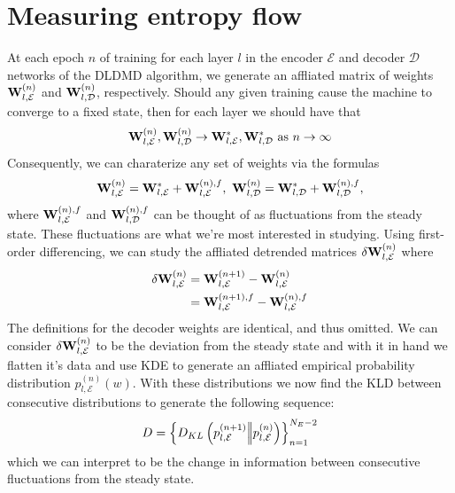 \section{Measuring entropy flow}
At each epoch $n$ of training for each layer $l$ in the encoder $\mathcal{E}$ and 
decoder $\mathcal{D}$ networks of the DLDMD algorithm, we generate an affliated matrix 
of weights ${\bf W}_{l,\mathcal{E}}^{(n)}$ and ${\bf W}_{l,\mathcal{D}}^{(n)}$, respectively.
Should any given training cause the machine to converge to a fixed state, then for each layer
we should have that
\begin{equation}
    {\bf W}_{l,\mathcal{E}}^{(n)}, {\bf W}_{l,\mathcal{D}}^{(n)} \to 
    {\bf W}_{l,\mathcal{E}}^{*}, {\bf W}_{l,\mathcal{D}}^{*} \text{ as }
    n \to \infty \label{eqn:weight convergence}
\end{equation}
Consequently, we can charaterize any set of weights via the formulas
\begin{equation}
    {\bf W}_{l,\mathcal{E}}^{(n)} = {\bf W}_{l,\mathcal{E}}^{*} + {\bf W}_{l,\mathcal{E}}^{(n),f},\
    {\bf W}_{l,\mathcal{D}}^{(n)} = {\bf W}_{l,\mathcal{D}}^{*} + {\bf W}_{l,\mathcal{D}}^{(n),f},
\end{equation}
where ${\bf W}_{l,\mathcal{E}}^{(n),f}$ and 
${\bf W}_{l,\mathcal{D}}^{(n),f}$ can be thought of as fluctuations from the 
steady state. These fluctuations are what we're 
most interested in studying. Using first-order differencing, we can study the affliated 
detrended matrices $\delta{\bf W}_{l,\mathcal{E}}^{(n)}$ where
\begin{align}
    \delta{\bf W}_{l,\mathcal{E}}^{(n)} &= {\bf W}_{l,\mathcal{E}}^{(n+1)} - {\bf W}_{l,\mathcal{E}}^{(n)} \\
    &= {\bf W}_{l,\mathcal{E}}^{(n+1),f} - {\bf W}_{l,\mathcal{E}}^{(n),f}
\end{align}
The definitions for the decoder weights are identical, and thus omitted. We can consider 
$\delta{\bf W}_{l,\mathcal{E}}^{(n)}$ to be the deviation from the steady state and with it 
in hand we flatten it's data and use KDE to generate an affliated empirical probability 
distribution $p_{l,\mathcal{E}}^{(n)}(w)$. With these distributions we now find the KLD 
between consecutive distributions to generate the following sequence: 
\begin{equation}
    D = \left\{D_{KL}\left(p_{l,\mathcal{E}}^{(n+1)} \Big|\!\Big| p_{l,\mathcal{E}}^{(n)}\right)\right\}_{n=1}^{N_E - 2}
\end{equation}
which we can interpret to be the change in information between consecutive fluctuations from the 
steady state.

